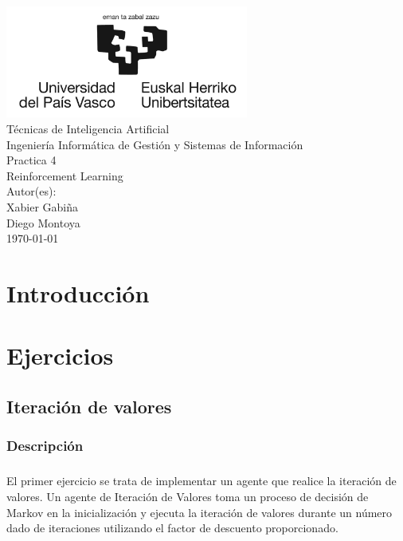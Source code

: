 \documentclass{report}
\begin{document}
  \begin{titlepage}
      \centering
      \includegraphics[width=0.6\textwidth]{./.img/logo.jpg}\\
      \vspace{1cm}
      \LARGE Técnicas de Inteligencia Artificial\\
      \vspace{0.5cm}
      \Large Ingeniería Informática de Gestión y Sistemas de Información\\
      \vspace{3cm}
      \Huge Practica 4\\
      \huge Reinforcement Learning\\
      \vspace{2.5cm}
      \Large Autor(es):\\
      \vspace{0.2cm}
      \large Xabier Gabiña\\
      \large Diego Montoya\\
      \vfill
      \today
  \end{titlepage}
  \tableofcontents
  \lstlistoflistings
  \chapter{Introducción}
  \chapter{Ejercicios}
    \section{Iteración de valores}
      \subsection*{Descripción}
        \paragraph*{}{
          El primer ejercicio se trata de implementar un agente que realice la iteración de valores. 
          Un agente de Iteración de Valores toma un proceso de decisión de Markov en la inicialización y ejecuta la iteración de valores durante un número dado de iteraciones utilizando el factor de descuento proporcionado.
        }
\end{document}
